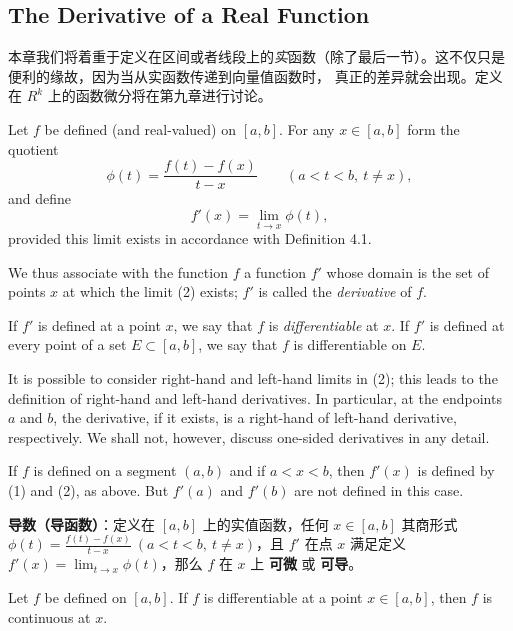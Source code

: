 \documentclass[../poma-notes.tex]{subfiles}
\begin{document}
\subsection*{The Derivative of a Real Function}

本章我们将着重于定义在区间或者线段上的\textit{实}函数（除了最后一节）。这不仅只是便利的缘故，因为当从实函数传递到向量值函数时，
真正的差异就会出现。定义在 $R^k$ 上的函数微分将在第九章进行讨论。

\begin{definition}
  Let $f$ be defined (and real-valued) on $[a, b]$. For any $x \in [a,b]$ form the quotient
  \begin{equation}
    \phi(t) = \frac{f(t) - f(x)}{t - x} \qquad (a<t<b,\ t \ne x),
  \end{equation}
  and define
  \begin{equation}
    f'(x) = \lim_{t \to x} \phi(t),
  \end{equation}
  provided this limit exists in accordance with Definition 4.1.

  We thus associate with the function $f$ a function $f'$ whose domain is the set of points $x$ at which the
  limit (2) exists; $f'$ is called the \textit{derivative} of $f$.

  If $f'$ is defined at a point $x$, we say that $f$ is \textit{differentiable} at $x$. If $f'$ is defined at
  every point of a set $E \subset [a,b]$, we say that $f$ is differentiable on $E$.

  It is possible to consider right-hand and left-hand limits in (2); this leads to the definition of right-hand
  and left-hand derivatives. In particular, at the endpoints $a$ and $b$, the derivative, if it exists, is a
  right-hand of left-hand derivative, respectively. We shall not, however, discuss one-sided derivatives in
  any detail.

  If $f$ is defined on a segment $(a, b)$ and if $a<x<b$, then $f'(x)$ is defined by (1) and (2), as above.
  But $f'(a)$ and $f'(b)$ are not defined in this case.
\end{definition}

\begin{anote}
  \textbf{导数（导函数）}：定义在 $[a, b]$ 上的实值函数，任何 $x \in [a, b]$ 其商形式 $\phi(t)=\frac{f(t)-f(x)}{t-x}
    \ (a < t < b,\ t \ne x)$，且 $f'$ 在点 $x$ 满足定义 $f'(x) = \lim_{t \to x} \phi(t)$，那么 $f$ 在 $x$ 上
  \textbf{可微} 或 \textbf{可导}。
\end{anote}

\begin{theorem}
  Let $f$ be defined on $[a, b]$. If $f$ is differentiable at a point $x \in [a, b]$, then $f$ is continuous
  at $x$.
\end{theorem}
\end{document}
